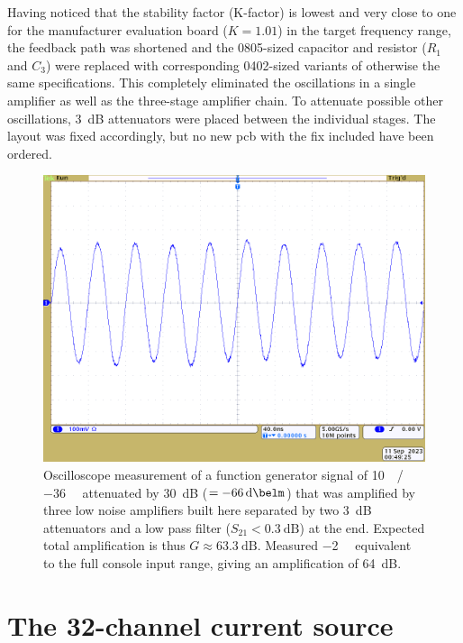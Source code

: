 Having noticed that the stability factor (K-factor) is lowest and very close to one for the manufacturer evaluation board (\(K = 1.01\)) in the target frequency range, the feedback path was shortened and the 0805-sized capacitor and resistor (\(R_1\) and \(C_3\)) were replaced with corresponding 0402-sized variants of otherwise the same specifications. This completely eliminated the oscillations in a single amplifier as well as the three-stage amplifier chain. To attenuate possible other oscillations, \qty{3}{\deci\bel} attenuators were placed between the individual stages. The layout was fixed accordingly, but no new \acrshort{pcb} with the fix included have been ordered.

\begin{figure}[hbt]
    \centering
    \includegraphics[width=\textwidth]{images/preamp-10mVpp_30dB_attenuation_3_lna_2x3dB_attenuation_27MHz_lowpass_4_protection_diodes.png}
    \caption{ Oscilloscope measurement of a function generator signal of \qty{10}{\milli\vpp}/\qty{-36}{\deci\belm} attenuated by \qty{30}{\deci\bel} (\(= \qty{-66}{\deci\belm}\)) that was amplified by three low noise amplifiers built here separated by two \qty{3}{\deci\bel} attenuators and a low pass filter (\(S_{21} < \qty{0.3}{\deci\bel}\)) at the end. Expected total amplification is thus \(G \approx \qty{63.3}{\deci\bel}\). Measured \qty{-2}{\deci\belm} equivalent to the full console input range, giving an amplification of \qty{64}{\deci\bel}.}
\end{figure}

\section{The 32-channel current source}

